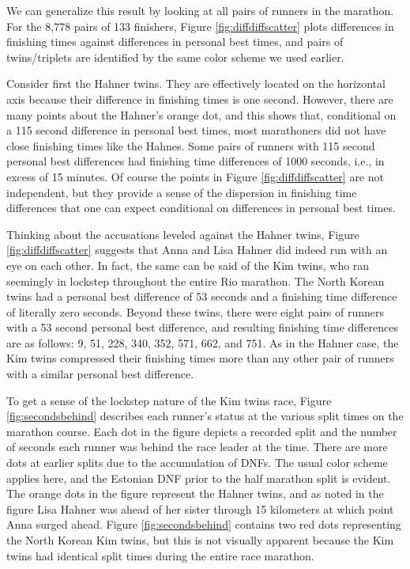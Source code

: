\documentclass[12pt,titlepage]{article}
\begin{document}
We can generalize this result by looking at all pairs of runners in
the marathon.  For the 8,778 pairs of 133 finishers, Figure
\ref{fig:diffdiffscatter} plots differences in finishing times against
differences in personal best times, and pairs of twins/triplets are
identified by the same color scheme we used earlier.

Consider first the Hahner twins.  They are effectively located on the
horizontal axis because their difference in finishing times is one
second.  However, there are many points about the Hahner's orange dot,
and this shows that, conditional on a 115 second difference in
personal best times, most marathoners did not have close finishing
times like the Hahnes.  Some pairs of runners with 115 second personal
best differences had finishing time differences of 1000 seconds, i.e.,
in excess of 15 minutes.  Of course the points in Figure
\ref{fig:diffdiffscatter} are not independent, but they provide a
sense of the dispersion in finishing time differences that one can
expect conditional on differences in personal best times.

Thinking about the accusations leveled against the Hahner twins,
Figure \ref{fig:diffdiffscatter} suggests that Anna and Lisa Hahner
did indeed run with an eye on each other.  In fact, the same can be
said of the Kim twins, who ran seemingly in lockstep throughout the
entire Rio marathon.  The North Korean twins had a personal best
difference of 53 seconds and a finishing time difference of literally
zero seconds.  Beyond these twins, there were eight pairs of runners
with a 53 second personal best difference, and resulting finishing
time differences are as follows: 9, 51, 228, 340, 352, 571, 662, and
751.  As in the Hahner case, the Kim twins compressed their finishing
times more than any other pair of runners with a similar personal best
difference.

To get a sense of the lockstep nature of the Kim twins race, Figure
\ref{fig:secondsbehind} describes each runner's status at the various
split times on the marathon course.  Each dot in the figure depicts a
recorded split and the number of seconds each runner was behind the
race leader at the time.  There are more dots at earlier splits due to
the accumulation of DNFs.  The usual color scheme applies here, and
the Estonian DNF prior to the half marathon split is evident.  The
orange dots in the figure represent the Hahner twins, and as noted in
the figure Lisa Hahner was ahead of her sister through 15 kilometers
at which point Anna surged ahead.  Figure \ref{fig:secondsbehind}
contains two red dots representing the North Korean Kim twins, but
this is not visually apparent because the Kim twins had identical
split times during the entire race marathon.
\end{document}
